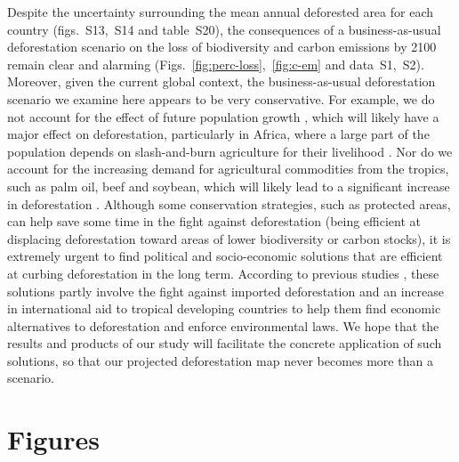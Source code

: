 \documentclass[
  12pt,
]{article}
\begin{document}
Despite the uncertainty surrounding the mean annual deforested area for each country (figs.~S13,~S14 and table~S20), the consequences of a business-as-usual deforestation scenario on the loss of biodiversity and carbon emissions by 2100 remain clear and alarming (Figs.~\ref{fig:perc-loss},~\ref{fig:c-em} and data~S1,~S2). Moreover, given the current global context, the business-as-usual deforestation scenario we examine here appears to be very conservative. For example, we do not account for the effect of future population growth \citep{Raftery2012}, which will likely have a major effect on deforestation, particularly in Africa, where a large part of the population depends on slash-and-burn agriculture for their livelihood \citep{Barnes1990, Vieilledent2020}. Nor do we account for the increasing demand for agricultural commodities from the tropics, such as palm oil, beef and soybean, which will likely lead to a significant increase in deforestation \citep{Strona2018, Karstensen2013}. Although some conservation strategies, such as protected areas, can help save some time in the fight against deforestation (being efficient at displacing deforestation toward areas of lower biodiversity or carbon stocks), it is extremely urgent to find political and socio-economic solutions that are efficient at curbing deforestation in the long term. According to previous studies \citep{Geist2002, Soares-Filho2014, Vieilledent2020, Jones2019, Pendrill2019}, these solutions partly involve the fight against imported deforestation and an increase in international aid to tropical developing countries to help them find economic alternatives to deforestation and enforce environmental laws. We hope that the results and products of our study will facilitate the concrete application of such solutions, so that our projected deforestation map never becomes more than a scenario.\\

\nolinenumbers
\newpage

\hypertarget{figures}{%
\section*{Figures}\label{figures}}
\end{document}
